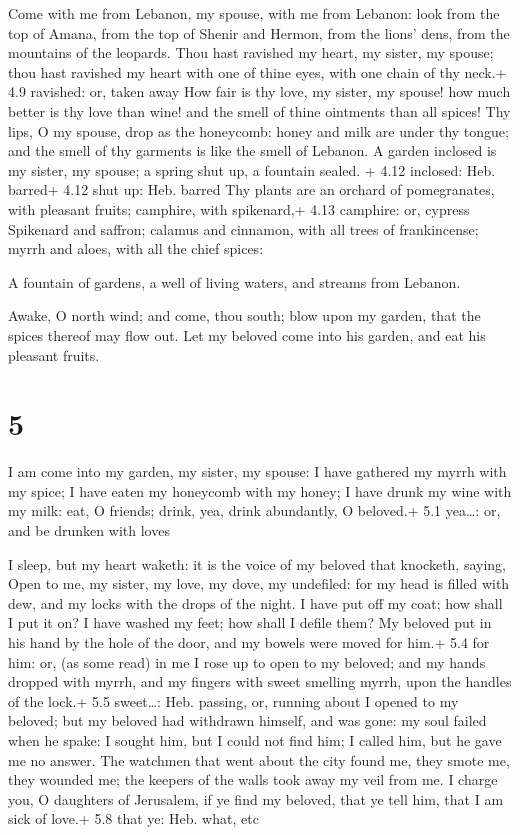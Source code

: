  Come with me from Lebanon, my spouse, with me from
Lebanon: look from the top of Amana, from the top of Shenir and Hermon,
from the lions' dens, from the mountains of the leopards. 
Thou hast ravished my heart, my sister, my spouse; thou hast ravished my
heart with one of thine eyes, with one chain of thy neck.+ 4.9 ravished:
or, taken away  How fair is thy love, my sister, my spouse!
how much better is thy love than wine! and the smell of thine ointments
than all spices!  Thy lips, O my spouse, drop as the
honeycomb: honey and milk are under thy tongue; and the smell of thy
garments is like the smell of Lebanon.  A garden inclosed
is my sister, my spouse; a spring shut up, a fountain sealed. + 4.12
inclosed: Heb. barred+ 4.12 shut up: Heb. barred  Thy
plants are an orchard of pomegranates, with pleasant fruits; camphire,
with spikenard,+ 4.13 camphire: or, cypress  Spikenard and
saffron; calamus and cinnamon, with all trees of frankincense; myrrh and
aloes, with all the chief spices:

 A fountain of gardens, a well of living waters, and
streams from Lebanon.

 Awake, O north wind; and come, thou south; blow upon my
garden, that the spices thereof may flow out. Let my beloved come into
his garden, and eat his pleasant fruits.

\hypertarget{section-4}{%
\section{5}\label{section-4}}

 I am come into my garden, my sister, my spouse: I have
gathered my myrrh with my spice; I have eaten my honeycomb with my
honey; I have drunk my wine with my milk: eat, O friends; drink, yea,
drink abundantly, O beloved.+ 5.1 yea\ldots: or, and be drunken with
loves

 I sleep, but my heart waketh: it is the voice of my
beloved that knocketh, saying, Open to me, my sister, my love, my dove,
my undefiled: for my head is filled with dew, and my locks with the
drops of the night.  I have put off my coat; how shall I put
it on? I have washed my feet; how shall I defile them?  My
beloved put in his hand by the hole of the door, and my bowels were
moved for him.+ 5.4 for him: or, (as some read) in me  I
rose up to open to my beloved; and my hands dropped with myrrh, and my
fingers with sweet smelling myrrh, upon the handles of the lock.+ 5.5
sweet\ldots: Heb. passing, or, running about  I opened to my
beloved; but my beloved had withdrawn himself, and was gone: my soul
failed when he spake: I sought him, but I could not find him; I called
him, but he gave me no answer.  The watchmen that went about
the city found me, they smote me, they wounded me; the keepers of the
walls took away my veil from me.  I charge you, O daughters
of Jerusalem, if ye find my beloved, that ye tell him, that I am sick of
love.+ 5.8 that ye: Heb. what, etc

